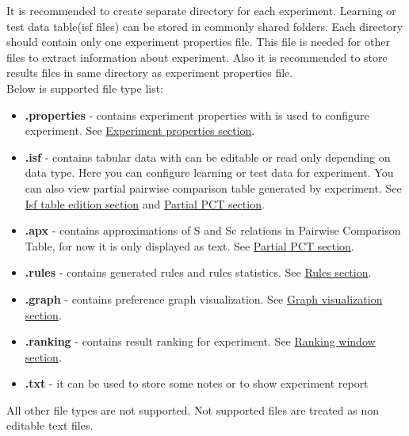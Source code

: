 It is recommended to create separate directory for each experiment. Learning or test data table(isf files) can be stored in commonly shared folders. Each directory should contain only one experiment properties file. This file is needed for other files to extract information about experiment. Also it is recommended to store results files in same directory as experiment properties file.\\

Below is supported file type list:
\begin{itemize}
	\item \textbf{.properties} - contains experiment properties with is used to configure experiment. See \hyperref[section:properties]{Experiment properties section}.
	\item \textbf{.isf} - contains tabular data with can be editable or read only depending on data type. Here you can configure learning or test data for experiment. You can also view partial pairwise comparison table generated by experiment.
	See \hyperref[section:isf-table]{Isf table edition section} and  \hyperref[sub:pct-isf]{Partial PCT section}.
	\item \textbf{.apx} - contains approximations of S and Sc relations in Pairwise Comparison Table, for now it is only displayed as text.
	See \hyperref[sub:pct-apx]{Partial PCT section}.
	\item \textbf{.rules} - contains generated rules and rules statistics.
	See \hyperref[section:rules]{Rules section}.
	\item \textbf{.graph} - contains preference graph visualization.
	See \hyperref[section:graph]{Graph visualization section}.
	\item \textbf{.ranking} - contains result ranking for experiment.
	See \hyperref[section:ranking]{Ranking window section}.
	\item \textbf{.txt} - it can be used to store some notes or to show experiment report
\end{itemize}

All other file types are not supported. Not supported files are treated as non editable text files.

\vfill\newpage